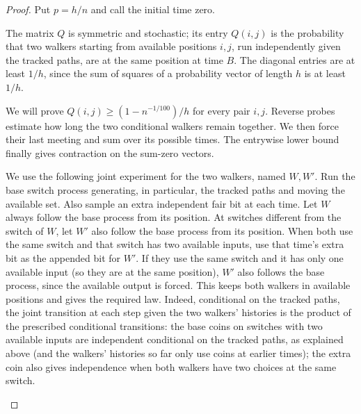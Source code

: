 \begin{proof}
Put $p=h/n$ and call the initial time zero.

\label{c:probes:p007}

The matrix $Q$ is symmetric and stochastic; its entry \(Q(i,j)\) is the probability that two walkers
starting from available positions \(i,j\), run independently given the tracked paths, are at the same
position at time \(B\). The diagonal entries are at least \(1/h\), since the sum of squares of
a probability vector of length \(h\) is at least \(1/h\).

We will prove $Q(i,j)\ge(1-n^{-1/100})/h$ for every pair $i,j$.
Reverse probes estimate how long the two conditional walkers remain
together. We then force their last meeting and sum over its possible
times. The entrywise lower bound finally gives contraction on the
sum-zero vectors.

\label{c:probes:p008}

We use the following joint experiment for the two walkers, named \(W,W'\). Run the base
switch process generating, in particular, the tracked paths and
moving the available set. Also sample an extra independent fair bit at each time. Let \(W\)
always follow the base process from its position. At switches different from the switch of
\(W\), let \(W'\) also follow the base process from its position. When both use the same switch
and that switch has two available inputs, use that time's extra bit as the appended bit for \(W'\). If
they use the same switch and it has only one available input (so they are at the same position), \(W'\)
also follows the base process, since the available output is forced. This keeps both walkers in
available positions and gives the required law. Indeed, conditional on the tracked paths, the joint
transition at each step given the two walkers' histories is the product of the prescribed
conditional transitions: the base coins on switches with two available inputs are independent conditional
on the tracked paths, as explained above (and the walkers' histories so far only use coins at
earlier times); the extra coin also gives independence when both walkers have two choices at the same
switch.

\label{c:probes:p009}


\end{proof}
